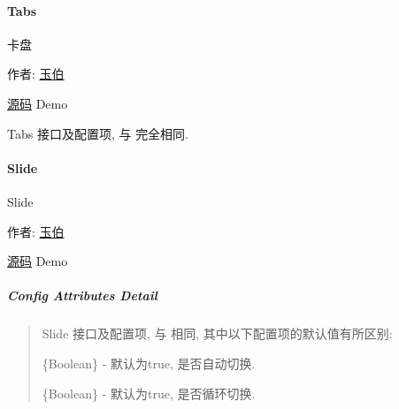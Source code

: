 \documentclass[letterpaper,10pt,english]{sphinxmanual}
\begin{document}
\label{api/component/switchable/tabs:module-Tabs}

\paragraph{Tabs}
\label{api/component/switchable/tabs:tabs}\label{api/component/switchable/tabs::doc}
\begin{DUlineblock}{0em}
\item[] 卡盘
\item[] 作者: \href{mailto:lifesinger@gmail.com}{玉伯}
\item[] \href{https://github.com/kissyteam/kissy/tree/master/src/switchable/tabs/}{源码} \textbar{} Demo
\item[] Tabs 接口及配置项, 与 {\hyperref[api/component/switchable/switchable:module-Switchable]{}} 完全相同.
\end{DUlineblock}
\label{api/component/switchable/slide:module-Slide}

\paragraph{Slide}
\label{api/component/switchable/slide:slide}\label{api/component/switchable/slide::doc}
\begin{DUlineblock}{0em}
\item[] Slide
\item[] 作者: \href{mailto:lifesinger@gmail.com}{玉伯}
\item[] \href{https://github.com/kissyteam/kissy/tree/master/src/switchable/accordion/slide/}{源码} \textbar{} Demo
\end{DUlineblock}


\subparagraph{Config Attributes Detail}
\label{api/component/switchable/slide:config-attributes-detail}\begin{quote}

Slide 接口及配置项, 与 {\hyperref[api/component/switchable/switchable:module-Switchable]{}} 相同, 其中以下配置项的默认值有所区别:


\begin{fulllineitems}
\label{api/component/switchable/slide:Slide.autoplay}
\{Boolean\} - 默认为true, 是否自动切换.

\end{fulllineitems}



\begin{fulllineitems}
\label{api/component/switchable/slide:Slide.circular}
\{Boolean\} - 默认为true, 是否循环切换.

\end{fulllineitems}

\end{quote}
\label{api/component/switchable/carousel:module-Carousel}
\end{document}
